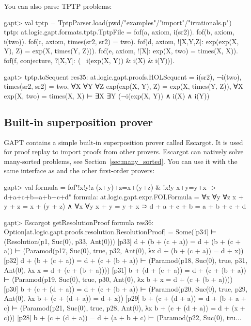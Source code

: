 \documentclass[a4paper,11pt]{article}
\newcommand{\cli}[1]{{\ttfamily {#1}}}
\begin{document}
You can also parse TPTP problems:
\begin{clilisting}
gapt> val tptp = TptpParser.load(pwd/"examples"/"import"/"irrationals.p")
tptp: at.logic.gapt.formats.tptp.TptpFile =
fof(a, axiom, i(sr2)).
fof(b, axiom, ~ i(two)).
fof(c, axiom, times(sr2, sr2) = two).
fof(d, axiom, ![X,Y,Z]: exp(exp(X, Y), Z) = exp(X, times(Y, Z))).
fof(e, axiom, ![X]: exp(X, two) = times(X, X)).
fof(f, conjecture, ?[X,Y]: (~ i(exp(X, Y)) & i(X) & i(Y))).

gapt> tptp.toSequent
res35: at.logic.gapt.proofs.HOLSequent =
i(sr2),
¬i(two),
times(sr2, sr2) = two,
∀X ∀Y ∀Z exp(exp(X, Y), Z) = exp(X, times(Y, Z)),
∀X exp(X, two) = times(X, X)
⊢
∃X ∃Y (¬i(exp(X, Y)) ∧ i(X) ∧ i(Y))

\end{clilisting}

\subsection{Built-in superposition prover}

GAPT contains a simple built-in superposition prover called Escargot.  It is
used for proof replay to import proofs from other provers. Escargot can natively
solve many-sorted problems, see Section~\ref{sec:many_sorted}. You can use it with
the same interface as \cli{Prover9} and the other first-order provers:

\begin{clilisting}
gapt> val formula = fof"!x!y!z (x+y)+z=x+(y+z) & !x!y x+y=y+x -> d+a+c+b=a+b+c+d"
formula: at.logic.gapt.expr.FOLFormula =
∀x ∀y ∀z x + y + z = x + (y + z) ∧ ∀x ∀y x + y = y + x ⊃
  d + a + c + b = a + b + c + d

gapt> Escargot getResolutionProof formula
res36: Option[at.logic.gapt.proofs.resolution.ResolutionProof] =
Some([p34]  ⊢    (Resolution(p1, Suc(0), p33, Ant(0)))
[p33] d + (b + (c + a)) = d + (b + (c + a)) ⊢    (Paramod(p17, Suc(0), true, p32, Ant(0), λx d + (b + (c + a)) = d + x))
[p32] d + (b + (c + a)) = d + (c + (b + a)) ⊢    (Paramod(p18, Suc(0), true, p31, Ant(0), λx x = d + (c + (b + a))))
[p31] b + (d + (c + a)) = d + (c + (b + a)) ⊢    (Paramod(p19, Suc(0), true, p30, Ant(0), λx b + x = d + (c + (b + a))))
[p30] b + (c + (d + a)) = d + (c + (b + a)) ⊢    (Paramod(p20, Suc(0), true, p29, Ant(0), λx b + (c + (d + a)) = d + x))
[p29] b + (c + (d + a)) = d + (b + a + c) ⊢    (Paramod(p21, Suc(0), true, p28, Ant(0), λx b + (c + (d + a)) = d + (x + c)))
[p28] b + (c + (d + a)) = d + (a + b + c) ⊢    (Paramod(p22, Suc(0), tru...

\end{clilisting}
\end{document}
